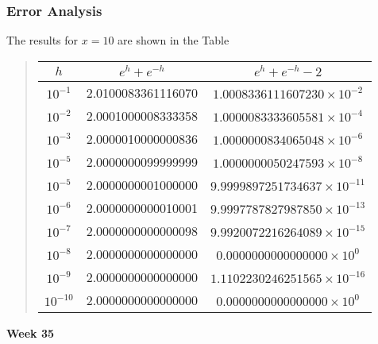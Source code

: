 \documentclass[handout]{beamer}
\newenvironment{block_mdfboxadmon}[1][]{\begin{block}{#1}}{\end{block}}
\begin{document}
\begin{frame}
\frametitle{Error Analysis}

\begin{block_mdfboxadmon}[]
The results for $x=10$ are shown in the Table


\begin{quote}
\begin{tabular}{ccc}
\hline
\multicolumn{1}{c}{ $h$ } & \multicolumn{1}{c}{ $e^{h}+e^{-h}$ } & \multicolumn{1}{c}{ $e^{h}+e^{-h}-2$ } \\
\hline
$10^{-1}$                           & 2.0100083361116070                  & $1.0008336111607230\times 10^{-2}$  \\
$10^{-2}$                           & 2.0001000008333358                  & $1.0000083333605581\times 10^{-4}$  \\
$10^{-3}$                           & 2.0000010000000836                  & $1.0000000834065048\times 10^{-6}$  \\
$10^{-5}$                           & 2.0000000099999999                  & $1.0000000050247593\times 10^{-8}$  \\
$10^{-5}$                           & 2.0000000001000000                  & $9.9999897251734637\times 10^{-11}$ \\
$10^{-6}$                           & 2.0000000000010001                  & $9.9997787827987850\times 10^{-13}$ \\
$10^{-7}$                           & 2.0000000000000098                  & $9.9920072216264089\times 10^{-15}$ \\
$10^{-8}$                           & 2.0000000000000000                  & $0.0000000000000000\times 10^{0}$   \\
$10^{-9}$                           & 2.0000000000000000                  & $1.1102230246251565\times 10^{-16}$ \\
$10^{-10}$                          & 2.0000000000000000                  & $0.0000000000000000\times 10^{0}$   \\
\hline
\end{tabular}
\end{quote}

\noindent
\end{block_mdfboxadmon}




\noindent\textbf{\Large Week 35}
\end{frame}
\end{document}
